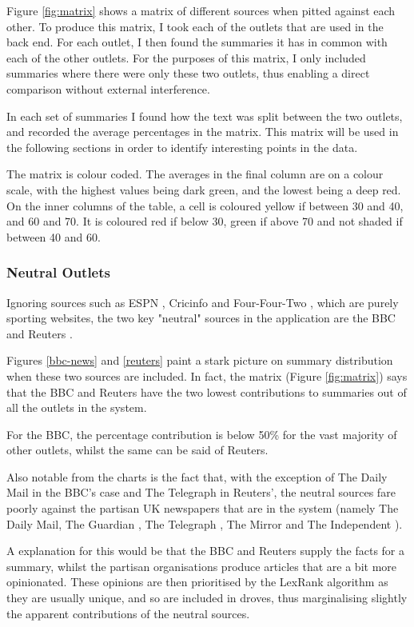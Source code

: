\documentclass[12pt]{article}
\begin{document}
Figure \ref{fig:matrix} shows a matrix of different sources when pitted against each other. To produce this matrix, I took each of the outlets that are used in the back end. For each outlet, I then found the summaries it has in common with each of the other outlets. For the purposes of this matrix, I only included summaries where there were only these two outlets, thus enabling a direct comparison without external interference.

In each set of summaries I found how the text was split between the two outlets, and recorded the average percentages in the matrix. This matrix will be used in the following sections in order to identify interesting points in the data. 

The matrix is colour coded. The averages in the final column are on a colour scale, with the highest values being dark green, and the lowest being a deep red. On the inner columns of the table, a cell is coloured yellow if between 30 and 40, and 60 and 70. It is coloured red if below 30, green if above 70 and not shaded if between 40 and 60.

\subsubsection{Neutral Outlets}

Ignoring sources such as ESPN \cite{espn}, Cricinfo \cite{cricinfo} and Four-Four-Two \cite{fourfourtwo}, which are purely sporting websites, the two key "neutral" sources in the application are the BBC \cite{bbc} and Reuters \cite{reuters}.

Figures \ref{bbc-news} and \ref{reuters} paint a stark picture on summary distribution when these two sources are included. In fact, the matrix (Figure \ref{fig:matrix}) says that the BBC and Reuters have the two lowest contributions to summaries out of all the outlets in the system. 

For the BBC, the percentage contribution is below 50\% for the vast majority of other outlets, whilst the same can be said of Reuters.

Also notable from the charts is the fact that, with the exception of The Daily Mail \cite{dailymail} in the BBC's case and The Telegraph in Reuters', the neutral sources fare poorly against the partisan UK newspapers that are in the system (namely The Daily Mail, The Guardian \cite{guardian}, The Telegraph \cite{telegraph}, The Mirror \cite{mirror} and The Independent \cite{independent}). 

A explanation for this would be that the BBC and Reuters supply the facts for a summary, whilst the partisan organisations produce articles that are a bit more opinionated. These opinions are then prioritised by the LexRank algorithm \cite{lexRank} as they are usually unique, and so are included in droves, thus marginalising slightly the apparent contributions of the neutral sources. 
\end{document}
